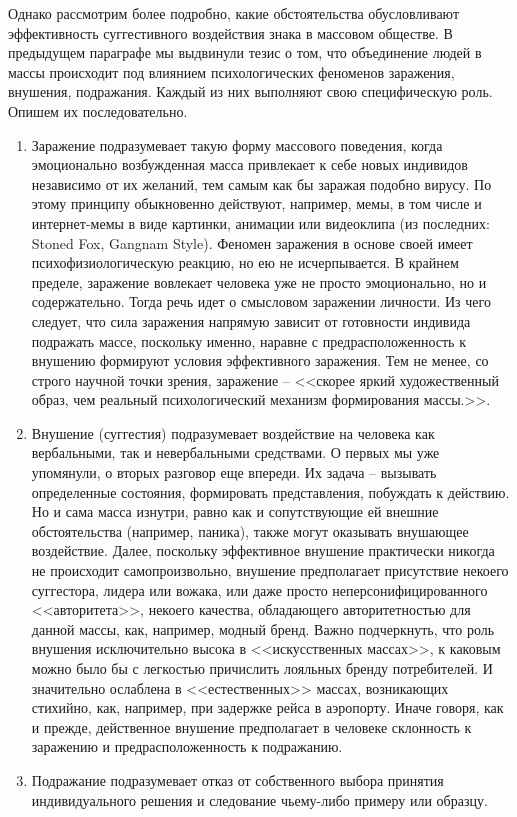 Однако рассмотрим более подробно, какие обстоятельства обусловливают эффективность
суггестивного воздействия знака в массовом обществе. В предыдущем параграфе мы выдвинули тезис о том, что объединение людей в массы
происходит под влиянием психологических феноменов заражения, внушения, подражания.
Каждый из них выполняют свою специфическую роль. Опишем их последовательно.
\begin{enumerate}
    \item Заражение подразумевает такую форму массового поведения, когда
    эмоционально возбужденная масса привлекает к себе новых индивидов независимо
    от их желаний, тем самым как бы заражая подобно вирусу.
    \autocite{freid_mass}\autocite{petrovsky1990}\autocite{porshnev1979}\autocite{olshansky}
    По этому принципу обыкновенно действуют, например, мемы, в том числе и интернет-мемы в
    виде картинки, анимации или видеоклипа (из последних: Stoned Fox, Gangnam Style). Феномен заражения в
    основе своей имеет психофизиологическую реакцию, но ею не исчерпывается.
    В крайнем пределе, заражение вовлекает человека уже не просто эмоционально,
    но и содержательно. Тогда речь идет о смысловом заражении личности.
    Из чего следует, что сила заражения напрямую зависит от готовности индивида
    подражать массе, поскольку именно, наравне с предрасположенность к внушению
    формируют условия эффективного заражения. Тем не менее, со строго научной точки
    зрения, заражение -- <<скорее яркий художественный образ, чем реальный
    психологический механизм формирования массы.>>\autocite[][86]{olshansky}.

    \item Внушение (суггестия) подразумевает воздействие на человека как вербальными,
    так и невербальными средствами. О первых мы уже упомянули, о вторых разговор еще
    впереди. Их задача -- вызывать определенные состояния, формировать представления,
    побуждать к действию. Но и сама масса изнутри, равно как и сопутствующие ей
    внешние обстоятельства (например, паника), также могут оказывать внушающее
    воздействие\autocite{behterev1898}\autocite{porshnev1979}. Далее, поскольку эффективное
    внушение практически никогда не происходит самопроизвольно, внушение предполагает
    присутствие некоего суггестора, лидера или вожака, или даже просто
    неперсонифицированного <<авторитета>>, некоего качества, обладающего
    авторитетностью для данной массы, как, например, модный бренд.
    Важно подчеркнуть, что роль внушения исключительно высока в <<искусственных массах>>\autocite[][69]{freid_mass}, к каковым можно было
    бы с легкостью причислить лояльных бренду потребителей. И значительно
    ослаблена в <<естественных>> массах, возникающих стихийно, как, например,
    при задержке рейса в аэропорту. Иначе говоря, как и прежде, действенное внушение
    предполагает в человеке склонность к заражению и предрасположенность к подражанию.

    \item Подражание подразумевает отказ от собственного выбора принятия
    индивидуального решения и следование чьему-либо примеру или образцу.
\end{enumerate}

